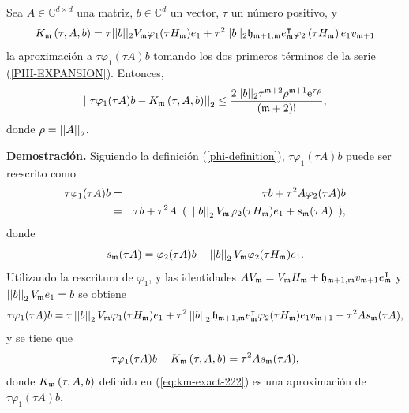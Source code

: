  \begin{lemma}\cite{naranjo2021locally}\label{lemma:CORRECTED-ERROR}
	Sea $A\in\mathbb{C}^{d\times d}$ una matriz, $b\in\mathbb{C}^{d}$ un vector, $\tau$ un número positivo, y 
	\begin{equation}
		{K_{\mathfrak{m}}\left(\tau,A , b \right) = \tau ||b||_2 V_{\mathfrak{m}}\varphi_1(\tau H_{\mathfrak{m}})e_1}+\tau^2 ||b||_2 \mathfrak{h}_{\mathfrak{m}+1,\mathfrak{m}}e_{\mathfrak{m}}^\intercal\varphi_2\left(\tau H_{\mathfrak{m}}\right) e_1 v_{\mathfrak{m}+1} \label{eq:km-exact-222}
	\end{equation}
	 la aproximación a $\tau \varphi_1(\tau A)b$ tomando los dos primeros términos de la serie (\ref{PHI-EXPANSION}). Entonces,
	\begin{gather*}
	\left\lvert\left\lvert \tau\varphi_1(\tau A)b - K_{\mf}\left(\tau,A , b \right) \right\rvert\right\rvert_2%
	\leq \frac{2\vert\lvert b \rvert\rvert_2\tau^{\mf+2}\rho^{\mf+1}\me{\tau \rho}}{(\mf+2)!},
	\end{gather*}
	donde $\rho=\left\lvert \left\lvert A \right\rvert \right\rvert_2$.
\end{lemma}
\textbf{Demostración.}
Siguiendo la definición (\ref{phi-definition}), $\tau \varphi_1(\tau A)b$ puede ser reescrito como
\begin{eqnarray*}
	\tau \varphi_1(\tau A)b &=& \tau b+\tau^{2}A\varphi_{2}(\tau A)b \\
	&=& \tau b+\tau^{2}A \,\ (\,\ \nnorm{\nnorm{b}}_2V_\mf\varphi_{2}(\tau H_\mf)e_1 +s_\mf(\tau A) \,\ ), %
\end{eqnarray*}
donde \[ s_{\mathfrak{m}} (\tau A)= \varphi_{2}(\tau A)b -\left\lvert \left\lvert b \right\rvert \right\rvert_2V_{\mathfrak{m}}\varphi_{2}(\tau H_{\mathfrak{m}})e_1 .\]
Utilizando la rescritura de $\varphi_1$, y las identidades $AV_{\mathfrak{m}}=V_{\mathfrak{m}} H_{\mathfrak{m}} + \mathfrak{h}_{\mathfrak{m}+1,\mathfrak{m}}v_{\mathfrak{m}+1}e^\intercal_{\mathfrak{m}}$ y  $\left\lvert \left\lvert b \right\rvert \right\rvert_2V_{\mathfrak{m}} e_1=b$ se obtiene
\begin{equation}
\tau\varphi_1(\tau A)b = \tau\nnorm{\nnorm{b}}_2V_\mf\varphi_1(\tau H_\mf)e_1 + \tau^{2}\nnorm{\nnorm{b}}_2\hf_{\mf+1,\mf}e^\intercal_\mf\varphi_{2}(\tau H_\mf)e_1v_{\mf+1}+\tau^{2}As_\mf (\tau A), %
\end{equation}
y se tiene que
\begin{equation}
\tau\varphi_1(\tau A)b - K_{\mathfrak{m}}\left(\tau,A , b \right) = \tau^{2}As_{\mathfrak{m}}(\tau A), \label{eq:phidiffasm}
\end{equation}
donde $K_{\mathfrak{m}}\left(\tau,A , b \right)$ definida en (\ref{eq:km-exact-222}) es una aproximación de $\tau \varphi_1(\tau A)b$.

